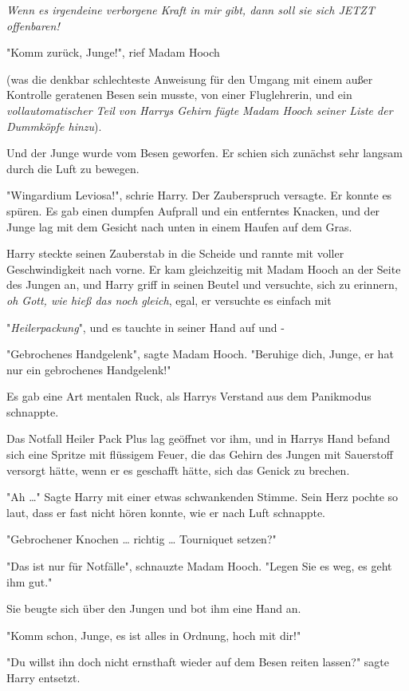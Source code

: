{\emph{Wenn es irgendeine verborgene Kraft in mir gibt, dann soll sie sich JETZT offenbaren!}

"Komm zurück, Junge!", rief Madam Hooch

(was die denkbar schlechteste Anweisung für den Umgang mit einem außer Kontrolle geratenen Besen sein musste, von einer Fluglehrerin, und ein \emph{vollautomatischer Teil von Harrys Gehirn fügte Madam Hooch seiner Liste der Dummköpfe hinzu}).

Und der Junge wurde vom Besen geworfen. Er schien sich zunächst sehr langsam durch die Luft zu bewegen.

"Wingardium Leviosa!", schrie Harry. Der Zauberspruch versagte. Er konnte es spüren. Es gab einen dumpfen Aufprall und ein entferntes Knacken, und der Junge lag mit dem Gesicht nach unten in einem Haufen auf dem Gras.

Harry steckte seinen Zauberstab in die Scheide und rannte mit voller Geschwindigkeit nach vorne. Er kam gleichzeitig mit Madam Hooch an der Seite des Jungen an, und Harry griff in seinen Beutel und versuchte, sich zu erinnern, \emph{oh Gott, wie hieß das noch gleich}, egal, er versuchte es einfach mit

"\emph{Heilerpackung}", und es tauchte in seiner Hand auf und -

"Gebrochenes Handgelenk", sagte Madam Hooch. "Beruhige dich, Junge, er hat nur ein gebrochenes Handgelenk!"

Es gab eine Art mentalen Ruck, als Harrys Verstand aus dem Panikmodus schnappte.

Das Notfall Heiler Pack Plus lag geöffnet vor ihm, und in Harrys Hand befand sich eine Spritze mit flüssigem Feuer, die das Gehirn des Jungen mit Sauerstoff versorgt hätte, wenn er es geschafft hätte, sich das Genick zu brechen.

"Ah …" Sagte Harry mit einer etwas schwankenden Stimme. Sein Herz pochte so laut, dass er fast nicht hören konnte, wie er nach Luft schnappte.

"Gebrochener Knochen … richtig … Tourniquet setzen?"

"Das ist nur für Notfälle", schnauzte Madam Hooch. "Legen Sie es weg, es geht ihm gut."

Sie beugte sich über den Jungen und bot ihm eine Hand an.

"Komm schon, Junge, es ist alles in Ordnung, hoch mit dir!"

"Du willst ihn doch nicht ernsthaft wieder auf dem Besen reiten lassen?" sagte Harry entsetzt.

}
